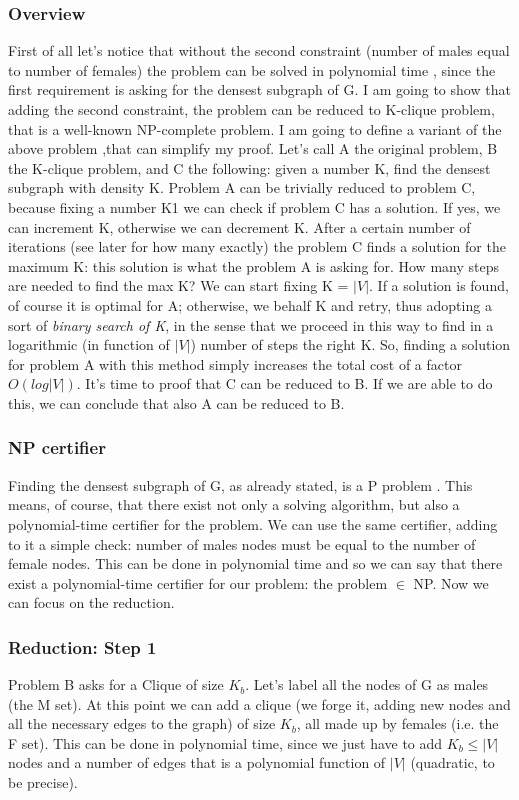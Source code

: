 \subsubsection{Overview}
First of all let's notice that without the second constraint (number of males equal to number of females) the problem can be solved in polynomial time \cite{Dense subgraph}, since the first requirement is asking for the densest subgraph of G. I am going to show that adding the second constraint, the problem can be reduced to K-clique problem, that is a well-known NP-complete problem. I am going to define a variant of the above problem ,that can simplify my proof. Let's call A the original problem, B the K-clique problem, and C the following: given a number K, find the densest subgraph with density K.
Problem A can be trivially reduced to problem C, because fixing a number K1 we can check if problem C has a solution. If yes, we can increment K, otherwise we can decrement K. After a certain number of iterations (see later for how many exactly) the problem C finds a solution for the maximum K: this solution is what the problem A is asking for. How many steps are needed to find the max K? We can start fixing K = $|V|$. If a solution is found, of course it is optimal for A; otherwise, we behalf K and retry, thus adopting a sort of \textit{binary search of K}, in the sense that we proceed in this way to find in a logarithmic (in function of $|V|$) number of steps the right K. So, finding a solution for problem A with this method simply increases the total cost of a factor $O(log|V|)$. It's time to proof that C can be reduced to B. If we are able to do this, we can conclude that also A can be reduced to B.
\subsubsection{NP certifier}
Finding the densest subgraph of G, as already stated, is a P problem \cite{Dense subgraph}. This means, of course, that there exist not only a solving algorithm, but also a polynomial-time certifier for the problem. We can use the same certifier, adding to it a simple check: number of males nodes must be equal to the number of female nodes. This can be done in polynomial time and so we can say that there exist a polynomial-time certifier for our problem: the problem $\in$ NP. Now we can focus on the reduction.
\subsubsection{Reduction: Step 1}
Problem B asks for a Clique of size $K_b$. Let's label all the nodes of G as males (the M set). At this point we can add a clique (we forge it, adding new nodes and all the necessary edges to the graph) of size $K_b$, all made up by females (i.e. the F set). This can be done in polynomial time, since we just have to add $K_b \leq |V|$ nodes and a number of edges that is a polynomial function of $|V|$ (quadratic, to be precise). 


